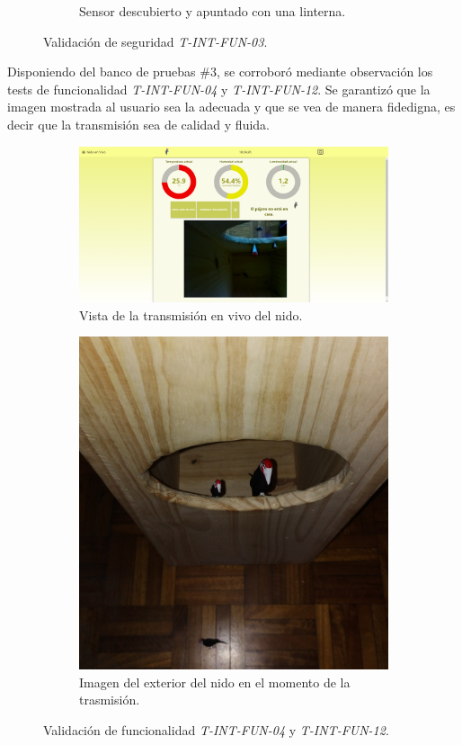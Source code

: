 \begin{figure}[H]
\begin{subfigure}{0.33\textwidth}
        \caption{Sensor descubierto y apuntado con una linterna.}
	\end{subfigure}
	\caption{Validación de seguridad \textit{T-INT-FUN-03}.}
	\label{fig:valLum}
\end{figure}

Disponiendo del banco de pruebas \#3, se corroboró mediante observación los tests de funcionalidad \textit{T-INT-FUN-04} y \textit{T-INT-FUN-12}. Se garantizó que la imagen mostrada al usuario sea la adecuada y que se vea de manera fidedigna, es decir que la transmisión sea de calidad y fluida.
\begin{figure}[H]
	\centering
    	\begin{subfigure}{0.49\textwidth}
        	\centering
        	\includegraphics[width=\linewidth]{ImagenesValidacion del prototipo/t-int-fun-04-12-1}		
			\caption{Vista de la transmisión en vivo del nido.}
        \end{subfigure}\hfill
        \begin{subfigure}{0.49\textwidth}
        	\centering        	
        	\includegraphics[width=0.5\linewidth]{ImagenesValidacion del prototipo/t-int-fun-04-12-2}
        	\caption{Imagen del exterior del nido en el momento de la trasmisión.}
        \end{subfigure}
	\caption{Validación de funcionalidad \textit{T-INT-FUN-04} y \textit{T-INT-FUN-12}.}
\end{figure}

